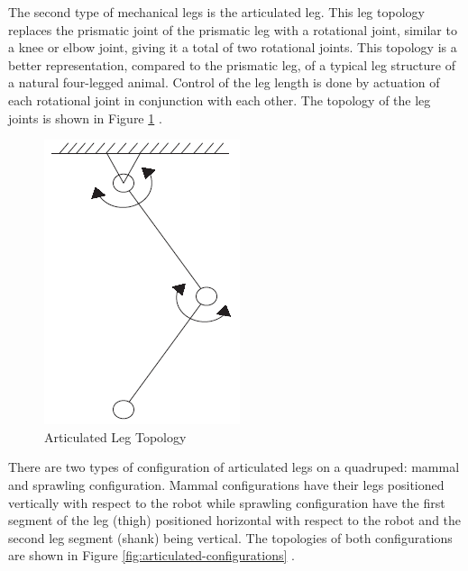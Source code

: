 \documentclass[english]{upeeei}
\begin{document}
The second type of mechanical legs is the articulated leg. This leg topology replaces the prismatic joint of the prismatic leg with a rotational joint, similar to a knee or elbow joint, giving it a total of two rotational joints. This topology is a better representation, compared to the prismatic leg, of a typical leg structure of a natural four-legged animal. Control of the leg length is done by actuation of each rotational joint in conjunction with each other. The topology of the leg joints is shown in Figure \ref{fig:articulated-leg} \cite{quadrobotlegs}. 

\begin{figure}[H]
\begin{centering}
\includegraphics[width=0.3\columnwidth]{images/articulated_leg}
\par\end{centering}
\caption{Articulated Leg Topology\label{fig:articulated-leg}}
\end{figure}

There are two types of configuration of articulated legs on a quadruped: mammal and sprawling configuration. Mammal configurations have their legs positioned vertically with respect to the robot while sprawling configuration have the first segment of the leg (thigh) positioned horizontal with respect to the robot and the second leg segment (shank) being vertical. The topologies of both configurations are shown in Figure \ref{fig:articulated-configurations} \cite{titanxiii}.
\end{document}

